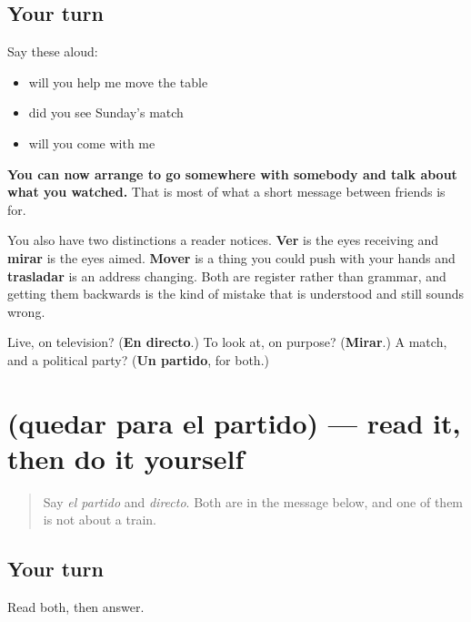 \subsection*{Your turn}
Say these aloud:

\begin{itemize}
\raggedright
  \item will you help me move the table
  \item did you see Sunday's match
  \item will you come with me
\end{itemize}

\begin{grammarlens}[title={What you've built}]
\textbf{You can now arrange to go somewhere with somebody and talk about what you watched.} That is most of what a short message between friends is for.

You also have two distinctions a reader notices. \textbf{Ver} is the eyes receiving and \textbf{mirar} is the eyes aimed. \textbf{Mover} is a thing you could push with your hands and \textbf{trasladar} is an address changing. Both are register rather than grammar, and getting them backwards is the kind of mistake that is understood and still sounds wrong.
\end{grammarlens}

\begin{tcolorbox}[breakable,colback=teal!4,colframe=teal!35!black,title={Before you move on}]
Live, on television? (\textbf{En directo}.) To look at, on purpose? (\textbf{Mirar}.) A match, and a political party? (\textbf{Un partido}, for both.)
\end{tcolorbox}
\section[Practice]{(quedar para el partido) — read it, then do it yourself}

\label{lesson:ES-C446-sintesis-mover}



\begin{quote}
Say \emph{el partido} and \emph{directo}. Both are in the message below, and one of them is not about a train.
\end{quote}

\subsection*{Your turn}
Read both, then answer.

